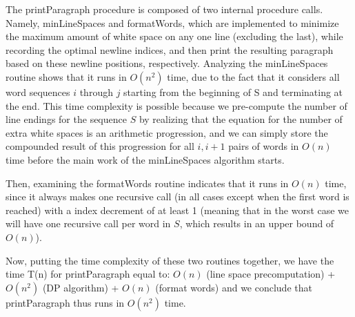 \documentclass[11pt]{article}
\begin{document}
\begin{prob}{3}
\end{prob}
\begin{sol}
The printParagraph procedure is composed of two internal procedure calls. Namely, minLineSpaces and formatWords, which are implemented to minimize the maximum amount of white space on any one line (excluding the last), while recording the optimal newline indices, and then print the resulting paragraph based on these newline positions, respectively. Analyzing the minLineSpaces routine shows that it runs in $O(n^2)$ time, due to the fact that it considers all word sequences $i$ through $j$ starting from the beginning of S and terminating at the end. This time complexity is possible because we pre-compute the number of line endings for the sequence $S$ by realizing that the equation for the number of extra white spaces is an arithmetic progression, and we can simply store the compounded result of this progression for all $i,i+1$ pairs of words in $O(n)$ time before the main work of the minLineSpaces algorithm starts.

Then, examining the formatWords routine indicates that it runs in $O(n)$ time, since it always makes one recursive call (in all cases except when the first word is reached) with a index decrement of at least 1 (meaning that in the worst case we will have one recursive call per word in $S$, which results in an upper bound of $O(n)$).

Now, putting the time complexity of these two routines together, we have the time T(n) for printParagraph equal to: $O(n)$ (line space precomputation) + $O(n^2)$ (DP algorithm) + $O(n)$ (format words) and we conclude that printParagraph thus runs in $O(n^2)$ time.
\end{sol}
\end{document}

